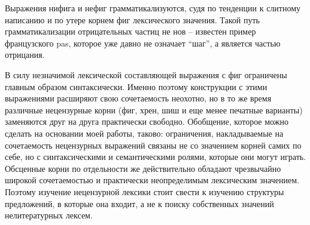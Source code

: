 \documentclass{article}
\begin{document}
Выражения нифига и нефиг грамматикализуются, судя по тенденции к слитному написанию и по утере корнем фиг лексического значения. Такой путь грамматикализации отрицательных частиц не нов -- известен пример французского pas, которое уже давно не означает “шаг”, а является частью отрицания.

В силу незначимой лексической составляющей выражения с фиг ограничены главным образом синтаксически. Именно поэтому конструкции с этими выражениями расширяют свою сочетаемость неохотно, но в то же время различные нецензурные корни (фиг, хрен, шиш и еще менее печатные варианты) заменяются друг на друга практически свободно. Обобщение, которое можно сделать на основании моей работы, таково: ограничения, накладываемые на сочетаемость нецензурных выражений связаны не со значением корней самих по себе, но с синтаксическими и семантическими ролями, которые они могут играть. Обсценные корни по отдельности же действительно обладают чрезвычайно широкой сочетаемостью и практически неопределимым лексическим значением. Поэтому изучение нецензурной лексики стоит свести к изучению структуры предложений, в которые она входит, а не к поиску собственных значений нелитературных лексем.
\end{document}
